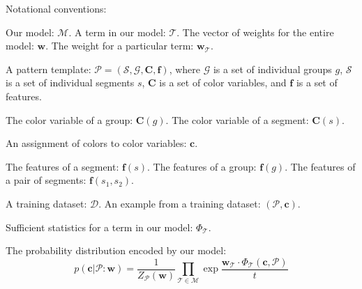 
\newcommand{\pattern}{\mathcal{P}}
\newcommand{\group}{g}
\newcommand{\groups}{\mathcal{G}}
\newcommand{\segment}{s}
\newcommand{\segments}{\mathcal{S}}
\newcommand{\model}{\mathcal{M}}
\newcommand{\term}{\mathcal{T}}
\newcommand{\weights}{\mathbf{w}}
\newcommand{\dataset}{\mathcal{D}}
\newcommand{\variable}[1]{\mathbf{#1}}
\newcommand{\colorVars}{\variable{C}}
\newcommand{\colors}{\variable{c}}
\newcommand{\features}{\variable{f}}
\newcommand{\termStats}{\Phi_\term}
\newcommand{\expectation}{\mathds{E}}

Notational conventions:

Our model: $\model$. A term in our model: $\term$. The vector of weights for the entire model: $\weights$. The weight for a particular term: $\weights_\term$.

A pattern template: $\pattern = (\segments, \groups, \colorVars, \features)$, where $\groups$ is a set of individual groups $\group$, $\segments$ is a set of individual segments $\segment$, $\colorVars$ is a set of color variables, and $\features$ is a set of features.

The color variable of a group: $\colorVars(\group)$. The color variable of a segment: $\colorVars(\segment)$.

An assignment of colors to color variables: $\colors$.

The features of a segment: $\features(\segment)$. The features of a group: $\features(\group)$. The features of a pair of segments: $\features(\segment_1, \segment_2)$.

A training dataset: $\dataset$. An example from a training dataset: $(\pattern, \colors)$.

Sufficient statistics for a term in our model: $\termStats$.

The probability distribution encoded by our model:
\begin{equation*}
p(\colors | \pattern : \weights) = \frac{1}{Z_\pattern(\weights)} \prod_{\term \in \model} \exp{\frac{ \weights_\term \cdot \termStats(\colors, \pattern)}{t}}
\end{equation*}